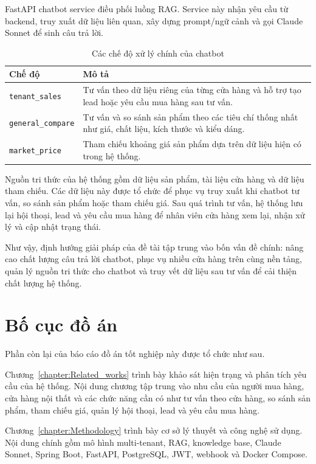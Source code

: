 \documentclass[../DoAn.tex]{subfiles}
\begin{document}
FastAPI chatbot service điều phối luồng RAG. Service này nhận yêu cầu từ backend, truy xuất dữ liệu liên quan, xây dựng prompt/ngữ cảnh và gọi Claude Sonnet để sinh câu trả lời. 

\begin{table}[H]
\centering
\caption{Các chế độ xử lý chính của chatbot}
\label{table:chatbot_modes}
\begin{tabular}{|p{}|p{}|}
\hline
\textbf{Chế độ} & \textbf{Mô tả} \\
\hline
\texttt{tenant\_sales} & Tư vấn theo dữ liệu riêng của từng cửa hàng và hỗ trợ tạo lead hoặc yêu cầu mua hàng sau tư vấn. \\
\hline
\texttt{general\_compare} & Tư vấn và so sánh sản phẩm theo các tiêu chí thống nhất như giá, chất liệu, kích thước và kiểu dáng. \\
\hline
\texttt{market\_price} & Tham chiếu khoảng giá sản phẩm dựa trên dữ liệu hiện có trong hệ thống. \\
\hline
\end{tabular}
\end{table}

Nguồn tri thức của hệ thống gồm dữ liệu sản phẩm, tài liệu cửa hàng và dữ liệu tham chiếu. Các dữ liệu này được tổ chức để phục vụ truy xuất khi chatbot tư vấn, so sánh sản phẩm hoặc tham chiếu giá. Sau quá trình tư vấn, hệ thống lưu lại hội thoại, lead và yêu cầu mua hàng để nhân viên cửa hàng xem lại, nhận xử lý và cập nhật trạng thái.

Như vậy, định hướng giải pháp của đề tài tập trung vào bốn vấn đề chính: nâng cao chất lượng câu trả lời chatbot, phục vụ nhiều cửa hàng trên cùng nền tảng, quản lý nguồn tri thức cho chatbot và truy vết dữ liệu sau tư vấn để cải thiện chất lượng hệ thống.

\section{Bố cục đồ án}
\label{section:1.4}

Phần còn lại của báo cáo đồ án tốt nghiệp này được tổ chức như sau.

Chương~\ref{chapter:Related_works} trình bày khảo sát hiện trạng và phân tích yêu cầu của hệ thống. Nội dung chương tập trung vào nhu cầu của người mua hàng, cửa hàng nội thất và các chức năng cần có như tư vấn theo cửa hàng, so sánh sản phẩm, tham chiếu giá, quản lý hội thoại, lead và yêu cầu mua hàng.

Chương~\ref{chapter:Methodology} trình bày cơ sở lý thuyết và công nghệ sử dụng. Nội dung chính gồm mô hình multi-tenant, RAG, knowledge base, Claude Sonnet, Spring Boot, FastAPI, PostgreSQL, JWT, webhook và Docker Compose.
\end{document}
